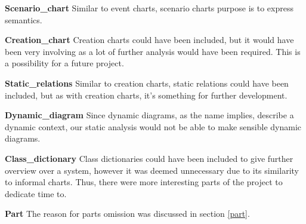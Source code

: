 \noindent\textbf{Scenario\_chart}\newline
Similar to event charts, scenario charts purpose is to express semantics.\newline\newline
  
\noindent\textbf{Creation\_chart}\newline
Creation charts could have been included, but it would have been very involving as a lot of further analysis would have been required. This is a possibility for a future project.\newline\newline
  
\noindent\textbf{Static\_relations}\newline
Similar to creation charts, static relations could have been included, but as with creation charts, it's something for further development.\newline\newline

\noindent\textbf{Dynamic\_diagram}\newline
Since dynamic diagrams, as the name implies, describe a dynamic context, our static analysis would not be able to make sensible dynamic diagrams.\newline\newline

\noindent\textbf{Class\_dictionary}\newline
Class dictionaries could have been included to give further overview over a system, however it was deemed unnecessary due to its similarity to informal charts. Thus, there were more interesting parts of the project to dedicate time to.\newline\newline

\noindent\textbf{Part}
The reason for parts omission was discussed in section \ref{part}.
